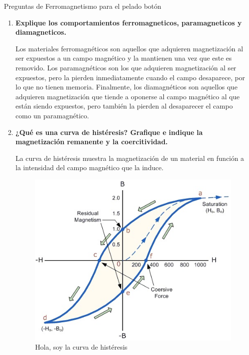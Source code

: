 \documentclass[a4paper,10pt,fleqn,oneside]{article}
\begin{document}


\bigskip
\noindent
\centering
Preguntas de Ferromagnetismo para el pelado botón


\begin{enumerate}[1.]
	\item \textbf{Explique los comportamientos ferromagneticos, paramagneticos y diamagneticos.}
		 
		 Los materiales ferromagnéticos son aquellos que adquieren magnetización al ser expuestos a un campo magnético y la mantienen una vez que este es removido. Los paramagnéticos son los que adquieren magnetización al ser expuestos, pero la pierden inmediatamente cuando el campo desaparece, por lo que no tienen memoria. Finalmente, los diamagnéticos son aquellos que adquieren magnetización que tiende a oponerse al campo magnético al que están siendo expuestos, pero también la pierden al desaparecer el campo como un paramagnético.
	\item \textbf{¿Qué es una curva de histéresis? Grafique e indique la magnetización remanente y la coercitividad.}
	
		La curva de histéresis muestra la magnetización de un material en función a la intensidad del campo magnético que la induce.

\begin{figure}[h]
	\centering
	\includegraphics[scale=0.5]{histeresis.jpg}
	\caption{Hola, soy la curva de histéresis}
	\label{CH}
\end{figure}		
		

\end{enumerate}
\end{document}
